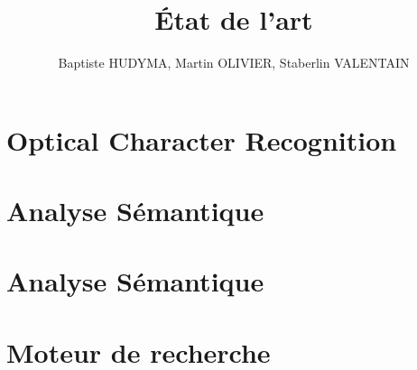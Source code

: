 \documentclass[a4paper, 12pt, titlepage, oneside, french]{article}
\author{Baptiste HUDYMA, Martin OLIVIER, Staberlin VALENTAIN}
\title{État de l'art}
\begin{document}
\maketitle

\tableofcontents


\section{Optical Character Recognition}
\newpage

\section{Analyse Sémantique}
\newpage

\section{Analyse Sémantique}
\newpage

\section{Moteur de recherche}
\newpage
\end{document}

